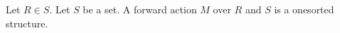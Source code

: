 \begin{struct}\label{parameter_forward_reference}
    Let $R\in S$.
    Let $S$ be a set.
    A forward action $M$ over $R$ and $S$ is a onesorted structure.
\end{struct}
